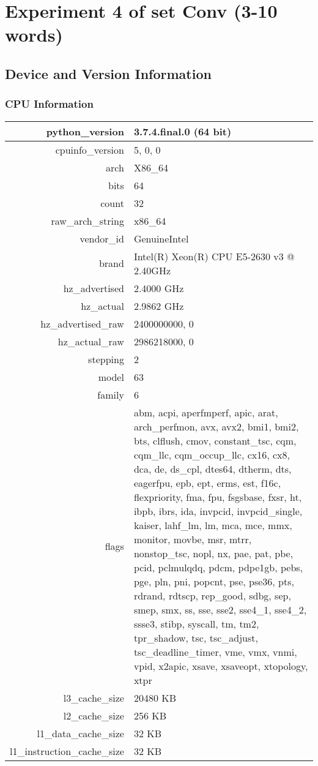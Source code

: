 \documentclass{article}%
\begin{document}
%
\normalsize%
\section{Experiment 4 of set Conv (3{-}10 words)}%
\label{sec:Experiment 4 of set Conv (3{-}10 words)}%
\subsection{Device and Version Information}%
\label{subsec:Device and Version Information}%
\subsubsection{CPU Information}%
\label{ssubsec:CPU Information}%
\begin{tabular}{|r|p{8cm}|}%
\hline%
python\_version&3.7.4.final.0 (64 bit)\\%
\hline%
cpuinfo\_version&5, 0, 0\\%
\hline%
arch&X86\_64\\%
\hline%
bits&64\\%
\hline%
count&32\\%
\hline%
raw\_arch\_string&x86\_64\\%
\hline%
vendor\_id&GenuineIntel\\%
\hline%
brand&Intel(R) Xeon(R) CPU E5{-}2630 v3 @ 2.40GHz\\%
\hline%
hz\_advertised&2.4000 GHz\\%
\hline%
hz\_actual&2.9862 GHz\\%
\hline%
hz\_advertised\_raw&2400000000, 0\\%
\hline%
hz\_actual\_raw&2986218000, 0\\%
\hline%
stepping&2\\%
\hline%
model&63\\%
\hline%
family&6\\%
\hline%
flags&abm, acpi, aperfmperf, apic, arat, arch\_perfmon, avx, avx2, bmi1, bmi2, bts, clflush, cmov, constant\_tsc, cqm, cqm\_llc, cqm\_occup\_llc, cx16, cx8, dca, de, ds\_cpl, dtes64, dtherm, dts, eagerfpu, epb, ept, erms, est, f16c, flexpriority, fma, fpu, fsgsbase, fxsr, ht, ibpb, ibrs, ida, invpcid, invpcid\_single, kaiser, lahf\_lm, lm, mca, mce, mmx, monitor, movbe, msr, mtrr, nonstop\_tsc, nopl, nx, pae, pat, pbe, pcid, pclmulqdq, pdcm, pdpe1gb, pebs, pge, pln, pni, popcnt, pse, pse36, pts, rdrand, rdtscp, rep\_good, sdbg, sep, smep, smx, ss, sse, sse2, sse4\_1, sse4\_2, ssse3, stibp, syscall, tm, tm2, tpr\_shadow, tsc, tsc\_adjust, tsc\_deadline\_timer, vme, vmx, vnmi, vpid, x2apic, xsave, xsaveopt, xtopology, xtpr\\%
\hline%
l3\_cache\_size&20480 KB\\%
\hline%
l2\_cache\_size&256 KB\\%
\hline%
l1\_data\_cache\_size&32 KB\\%
\hline%
l1\_instruction\_cache\_size&32 KB\\%
\hline%
\end{tabular}
\end{document}
